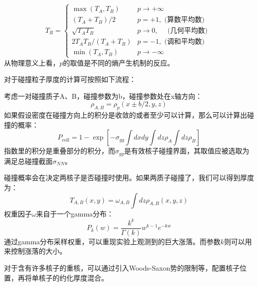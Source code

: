 \documentclass[aps,pre,12pt,preprint,onecolumn,showpacs,showkeys]{revtex4-1}
\begin{document}
\begin{equation}
T_{R}=\left\{\begin{array}{ll}{\max \left(T_{A}, T_{B}\right)} & {p \rightarrow+\infty} \\ 
{\left(T_{A}+T_{B}\right) / 2} & {p=+1, \text { (算数平均数) }} \\ 
{\sqrt{T_{A} T_{B}}} & {p\to0, \quad \text { (几何平均数) }} \\ 
{2 T_{A} T_{B} /\left(T_{A}+T_{B}\right)} & {p=-1, \text { (调和平均数) }} \\ 
{\min \left(T_{A}, T_{B}\right)} & {p \rightarrow-\infty}\end{array}\right.
\end{equation}
从物理意义上看，$p$的取值是不同的熵产生机制的反应。\par
对于碰撞粒子厚度的计算可按照如下流程：\par
考虑一对碰撞质子A、B，碰撞参数为b，碰撞参数处在x轴方向：
\begin{equation}
    \rho_{A,B}=\rho_{p}(x\pm b/2,y,z)
\end{equation}
如果假设密度在碰撞方向上的积分是收敛的或者至少可以计算，那么可以计算出碰撞的概率：
\begin{equation}
    P_{\mathrm{coll}}=1-\exp \left[-\sigma_{g g} \int d x d y \int d z \rho_{A} \int d z \rho_{B}\right]
\end{equation}
指数里的积分是重叠部分的积分，而$\sigma_{gg}$是有效核子碰撞界面，其取值应被选取为满足总碰撞截面$\sigma_{NN}$。
\par
碰撞概率会在决定两核子是否碰撞时使用。如果两质子碰撞了，我们可以得到厚度为：
\begin{equation}
    T_{A,B}(x,y)=\omega_{A,B}\int dz \rho_{A,B}(x,y,z)
\end{equation}
权重因子$\omega$来自于一个gamma分布：
\begin{equation}
    P_{k}(w)=\frac{k^{k}}{\Gamma(k)} w^{k-1} e^{-k w}
\end{equation}
通过gamma分布采样权重，可以重现实验上观测到的巨大涨落。而参数$k$则可以用来控制涨落的大小。\par
对于含有许多核子的重核，可以通过引入Woods-Saxon势的限制等，配置核子位置，再将单核子的约化厚度混合。
\end{document}
